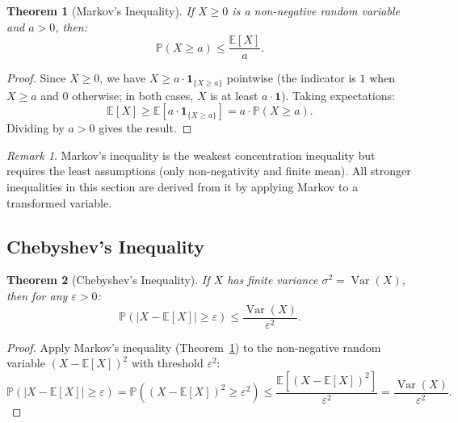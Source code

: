 \documentclass[11pt,a4paper]{article}
\theoremstyle{definition}
\theoremstyle{plain}
\newtheorem{theorem}{Theorem}[section]
\theoremstyle{remark}
\newtheorem{remark}{Remark}[section]
\DeclareMathOperator{\Var}{Var}
\newcommand{\E}{\mathbb{E}}
\newcommand{\Prob}{\mathbb{P}}
\newcommand{\indicator}{\mathbf{1}}
\begin{document}
\begin{keyresult}
\begin{theorem}[Markov's Inequality]
\label{thm:markov}
If $X \geq 0$ is a non-negative random variable and $a > 0$, then:
\begin{equation}
    \Prob(X \geq a) \leq \frac{\E[X]}{a}.
    \label{eq:markov}
\end{equation}
\end{theorem}
\end{keyresult}

\begin{proof}
Since $X \geq 0$, we have $X \geq a \cdot \indicator_{\{X \geq a\}}$ pointwise (the indicator is $1$ when $X \geq a$ and $0$ otherwise; in both cases, $X$ is at least $a \cdot \indicator$). Taking expectations:
\begin{equation}
    \E[X] \geq \E[a \cdot \indicator_{\{X \geq a\}}] = a \cdot \Prob(X \geq a).
\end{equation}
Dividing by $a > 0$ gives the result.
\end{proof}

\begin{remark}
Markov's inequality is the weakest concentration inequality but requires the least assumptions (only non-negativity and finite mean). All stronger inequalities in this section are derived from it by applying Markov to a transformed variable.
\end{remark}

\subsection{Chebyshev's Inequality}
\label{subsec:chebyshev}

\begin{keyresult}
\begin{theorem}[Chebyshev's Inequality]
\label{thm:chebyshev}
If $X$ has finite variance $\sigma^2 = \Var(X)$, then for any $\varepsilon > 0$:
\begin{equation}
    \Prob(|X - \E[X]| \geq \varepsilon) \leq \frac{\Var(X)}{\varepsilon^2}.
    \label{eq:chebyshev}
\end{equation}
\end{theorem}
\end{keyresult}

\begin{proof}
Apply Markov's inequality (Theorem~\ref{thm:markov}) to the non-negative random variable $(X - \E[X])^2$ with threshold $\varepsilon^2$:
\begin{equation}
    \Prob(|X - \E[X]| \geq \varepsilon) = \Prob\!\left((X - \E[X])^2 \geq \varepsilon^2\right) \leq \frac{\E[(X - \E[X])^2]}{\varepsilon^2} = \frac{\Var(X)}{\varepsilon^2}.
\end{equation}
\end{proof}
\end{document}
